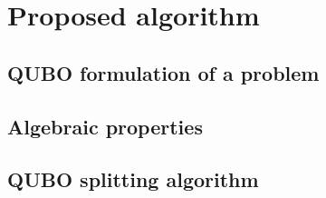 \chapter{Proposed algorithm}
\section{QUBO formulation of a problem}
\section{Algebraic properties}
\section{QUBO splitting algorithm}
